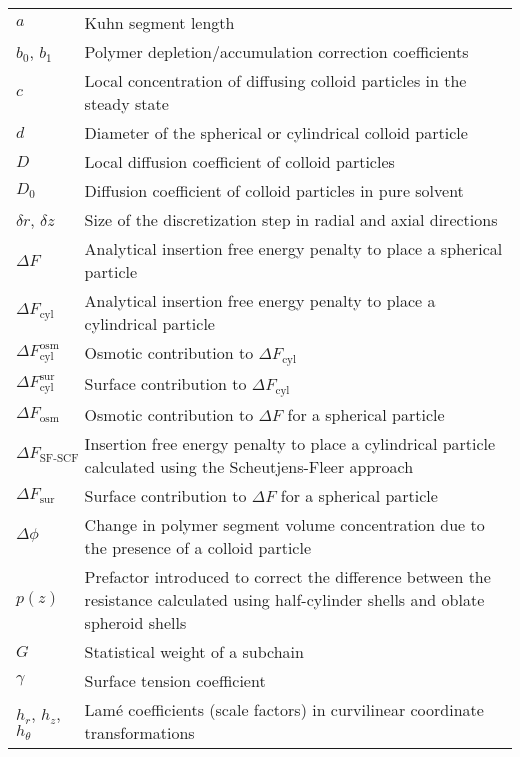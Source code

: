 \documentclass[10pt, a4paper, twocolumn]{article}
\begin{document}
\begin{tabularx}{\linewidth}{l X}
    $a$ & Kuhn segment length \\
    $b_0$, $b_1$ & Polymer depletion/accumulation correction coefficients \\
    $c$ & Local concentration of diffusing colloid particles in the steady state \\
    $d$ & Diameter of the spherical or cylindrical colloid particle \\
    $D$ & Local diffusion coefficient of colloid particles \\
    $D_0$ & Diffusion coefficient of colloid particles in pure solvent \\
    $\delta r$, $\delta z$ & Size of the discretization step in radial and axial directions \\
    $\Delta F$ & Analytical insertion free energy penalty to place a spherical particle \\
    $\Delta F_{\text{cyl}}$ & Analytical insertion free energy penalty to place a cylindrical particle \\
    $\Delta F_{\text{cyl}}^{\text{osm}}$ & Osmotic contribution to $\Delta F_{\text{cyl}}$ \\
    $\Delta F_{\text{cyl}}^{\text{sur}}$ & Surface contribution to $\Delta F_{\text{cyl}}$ \\
    $\Delta F_{\text{osm}}$ & Osmotic contribution to $\Delta F$ for a spherical particle\\
    $\Delta F_{\text{SF-SCF}}$ & Insertion free energy penalty to place a cylindrical particle calculated using the Scheutjens-Fleer approach \\
    $\Delta F_{\text{sur}}$ & Surface contribution to $\Delta F$ for a spherical particle\\
    $\Delta \phi$ & Change in polymer segment volume concentration due to the presence of a colloid particle \\
    $p(z)$ & Prefactor introduced to correct the difference between the resistance calculated using half-cylinder shells and oblate spheroid shells \\
    $G$ & Statistical weight of a subchain \\
    $\gamma$ & Surface tension coefficient \\
    $h_{r}$, $h_{z}$, $h_{\theta}$ & Lam\'e coefficients (scale factors) in curvilinear coordinate transformations \\

\end{tabularx}
\end{document}
